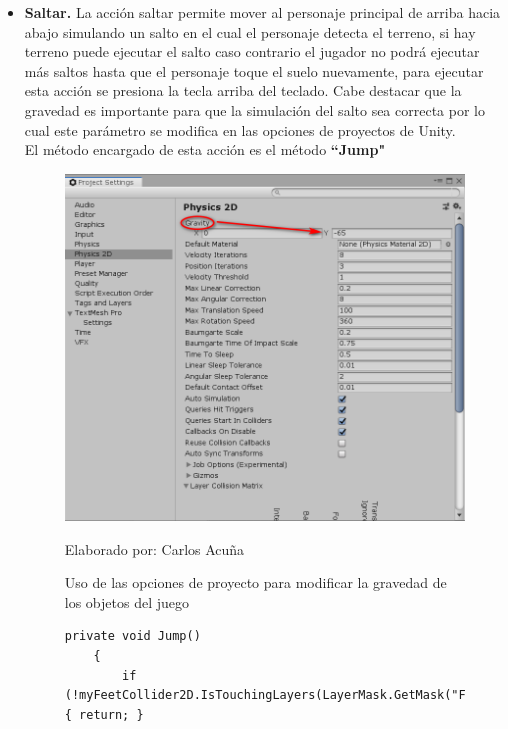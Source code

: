 \documentclass[a4paper, openright, 12pt]{report}
\begin{document}
\begin{itemize}
\item \textbf{Saltar.} La acción saltar permite mover al personaje principal de arriba hacia abajo simulando un salto en el cual el personaje detecta el terreno, si hay terreno puede ejecutar el salto caso contrario el jugador no podrá ejecutar más saltos hasta que el personaje toque el suelo nuevamente, para ejecutar esta acción se presiona la tecla arriba del teclado. Cabe destacar que la gravedad es importante para que la simulación del salto sea correcta por lo cual este parámetro se modifica en las opciones de proyectos de Unity.\\
El método encargado de esta acción es el método \textbf{``Jump"}

\begin{figure}[h]
\captionsetup{justification=centering,margin=2cm}
\includegraphics[scale=0.3]{T03_01}
\centering
\caption{Uso de las opciones de proyecto para modificar la gravedad de los objetos del juego}
Elaborado por: Carlos Acuña
\label{fig:T03_01}
\end{figure}

\begin{figure}[h]
\captionsetup{justification=centering,margin=2cm}
\centering
\lstset{language=C, breaklines=true, basicstyle=\footnotesize}
\lstset{numbers=left, numberstyle=\tiny, stepnumber=1, numbersep=-2pt}
\begin{lstlisting}[frame=single]
  private void Jump()
    {
        if (!myFeetCollider2D.IsTouchingLayers(LayerMask.GetMask("Foreground"))) { return; }


\end{lstlisting}
\end{figure}
\end{itemize}
\end{document}
